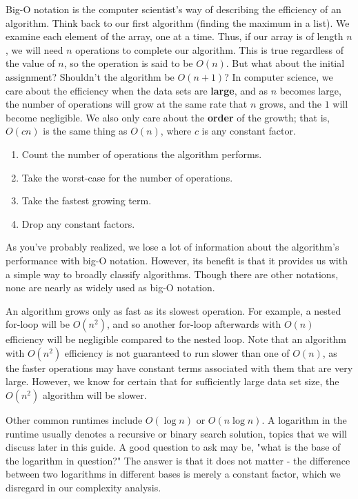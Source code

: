 Big-O notation is the computer scientist's way of describing the efficiency of an algorithm.  Think back to our first algorithm (finding the maximum in a list).  We examine each element of the array, one at a time.  Thus, if our array is of length $ n $, we will need $ n $ operations to complete our algorithm.  This is true regardless of the value of $ n $, so the operation is said to be $ O(n) $.  But what about the initial assignment? Shouldn't the algorithm be $ O(n + 1) $?  In computer science, we care about the efficiency when the data sets are \textbf{large}, and as $ n $ becomes large, the number of operations will grow at the same rate that $ n $ grows, and the $ 1 $ will become negligible.  We also only care about the \textbf{order} of the growth; that is, $ O(cn) $ is the same thing as $ O(n) $, where $ c $ is any constant factor.

\begin{enumerate}
    \item Count the number of operations the algorithm performs.
    \item Take the worst-case for the number of operations.
    \item Take the fastest growing term.
    \item Drop any constant factors.
\end{enumerate}

As you've probably realized, we lose a lot of information about the algorithm's performance with big-O notation. However, its benefit is that it provides us with a simple way to broadly classify algorithms. Though there are other notations, none are nearly as widely used as big-O notation.

An algorithm grows only as fast as its slowest operation.  For example, a nested for-loop will be $ O(n^2) $, and so another for-loop afterwards with $ O(n) $ efficiency will be negligible compared to the nested loop.  Note that an algorithm with $ O(n^2) $ efficiency is not guaranteed to run slower than one of $ O(n) $, as the faster operations may have constant terms associated with them that are very large.  However, we know for certain that for sufficiently large data set size, the $ O(n^2) $ algorithm will be slower.

Other common runtimes include $ O(\log n) $ or $ O(n\log n) $. A logarithm in the runtime usually denotes a recursive or binary search solution, topics that we will discuss later in this guide. A good question to ask may be, "what is the base of the logarithm in question?"  The answer is that it does not matter - the difference between two logarithms in different bases is merely a constant factor, which we disregard in our complexity analysis.

